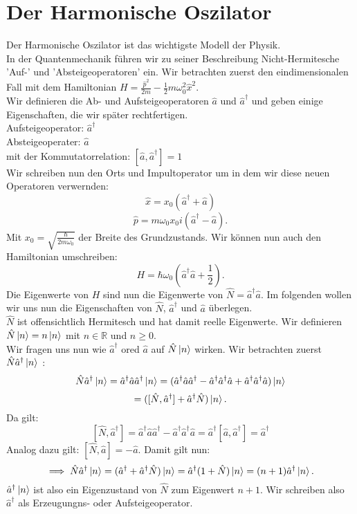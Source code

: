 \documentclass{report}
\begin{document}
\section{Der Harmonische Oszilator}
Der Harmonische Oszilator ist das wichtigste Modell der Physik.\\
In der Quantenmechanik führen wir zu seiner Beschreibung Nicht-Hermitesche 'Auf-' und 'Absteigeoperatoren' ein. Wir betrachten zuerst den eindimensionalen Fall mit dem Hamiltonian $H = \frac{\hat{p}^2}{2m} - \frac{1}{2} m \omega_0^2 \hat{x}^2$.\\
Wir definieren die Ab- und Aufsteigeoperatoren $\hat{a}$ und $\hat{a}^\dagger$ und geben einige Eigenschaften, die wir später rechtfertigen.\\
Aufsteigeoperator: $\hat{a}^\dagger$\\
Absteigeoperater: $\hat{a}$ \\
mit der Kommutatorrelation: $[\hat{a}, \hat{a}^\dagger]=1$ \\
Wir schreiben nun den Orts und Impultoperator um in dem wir diese neuen Operatoren verwernden: \[
	\hat{x} = x_0(\hat{a}^\dagger + \hat{a})
\] \[
\hat{p} = m\omega_0 x_0 i (\hat{a}^\dagger - \hat{a})
.\]  Mit $x_0 = \sqrt{\frac{\hbar}{2m\omega_0}}$ der Breite des Grundzustands. Wir können nun auch den Hamiltonian umschreiben: \[
H = \hbar \omega_0 (\hat{a}^\dagger \hat{a} + \frac{1}{2})
.\] Die Eigenwerte von $H$ sind nun die Eigenwerte von $\hat{N} = \hat{a}^\dagger \hat{a}$. Im folgenden wollen wir uns nun die Eigenschaften von $\hat{N}$, $\hat{a}^\dagger$ und $\hat{a}$ überlegen.\\
$\hat{N}$ ist offensichtlich Hermitesch und hat damit reelle Eigenwerte. Wir definieren $\hat{N} \ket{n} = n \ket{n} $ mit $n \in \mathbb{R}$ und $n \ge 0$.\\
Wir fragen uns nun wie $\hat{a}^\dagger$ ored $\hat{a}$ auf $\hat{N}\ket{n} $ wirken. Wir betrachten zuerst $\hat{N}\hat{a}^\dagger\ket{n} $ : \[
	\hat{N}\hat{a}^\dagger\ket{n} = \hat{a}^\dagger \hat{a} \hat{a}^\dagger \ket{n} = (\hat{a}^\dagger \hat{a} \hat{a}^\dagger - \hat{a}^\dagger \hat{a}^\dagger \hat{a} + \hat{a}^\dagger \hat{a}^\dagger \hat{a}) \ket{n} 
\] \[
= ([\hat{N}, \hat{a}^\dagger] + \hat{a}^\dagger \hat{N}) \ket{n} 
.\] Da gilt: \[
[\hat{N}, \hat{a}^\dagger] = \hat{a}^\dagger \hat{a} \hat{a}^\dagger - \hat{a}^\dagger \hat{a}^\dagger \hat{a} = \hat{a}^\dagger [\hat{a},\hat{a}^\dagger] = \hat{a}^\dagger
\] Analog dazu gilt: $[\hat{N}, \hat{a}] = -\hat{a}$. Damit gilt nun: \[
\implies \hat{N} \hat{a}^\dagger \ket{n} = (\hat{a}^\dagger + \hat{a}^\dagger \hat{N}) \ket{n} = \hat{a}^\dagger (1 + \hat{N}) \ket{n} = (n+1) \hat{a}^\dagger \ket{n}  
.\] $\hat{a}^\dagger \ket{n} $ ist also ein Eigenzustand von $\hat{N}$ zum Eigenwert $n+1$. Wir schreiben also $\hat{a}^\dagger$ als Erzeugungns- oder Aufsteigeoperator.\\
\end{document}

